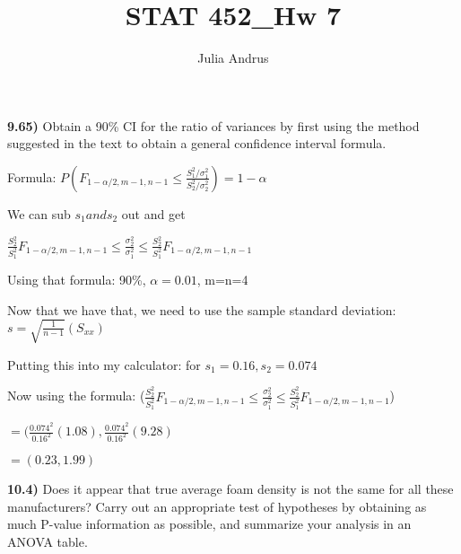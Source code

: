 \documentclass{article}
\title{STAT 452\_Hw 7}
\author{Julia Andrus}
\date{}
\begin{document}
\maketitle 


\textbf{9.65)} Obtain a 90\% CI for the ratio of variances by first using the method suggested in the text to obtain a general confidence interval formula.

\vspace{2mm}

Formula: $P(F_{1-\alpha/2, m-1, n-1} \le \frac{S^{2}_{1}/\sigma^{2}_{1}}{S^{2}_{2}/\sigma^{2}_{2}})=1-\alpha$

\vspace{2mm}

We can sub $s_{1} and s_{2}$ out and get 

\vspace{2mm}

$\frac{S^{2}_{2}}{S^{2}_{1}}F_{1-\alpha/2, m-1, n-1} \le \frac{\sigma^{2}_{2}}{\sigma^{2}_{1}} \le \frac{S^{2}_{2}}{S^{2}_{1}}F_{1-\alpha/2, m-1, n-1}$

\vspace{2mm}

Using that formula: 90\%, $\alpha=0.01$, m=n=4

\vspace{2mm}

Now that we have that, we need to use the sample standard deviation: $s=\sqrt{\frac{1}{n-1}}(S_{xx})$

\vspace{2mm}

Putting this into my calculator: for $s_{1}=0.16, s_{2}=0.074$

\vspace{2mm}

Now using the formula: ($\frac{S^{2}_{2}}{S^{2}_{1}}F_{1-\alpha/2, m-1, n-1} \le \frac{\sigma^{2}_{2}}{\sigma^{2}_{1}} \le \frac{S^{2}_{2}}{S^{2}_{1}}F_{1-\alpha/2, m-1, n-1}$)

\vspace{2mm}

$=(\frac{0.074^{2}}{0.16^{2}}(1.08), \frac{0.074^{2}}{0.16^{2}}(9.28)$

\vspace{2mm}

$=(0.23, 1.99)$


\newpage
\textbf{10.4)} Does it appear that true average foam density is not the same for all these manufacturers? Carry out an appropriate test of hypotheses by obtaining as much P-value information as possible, and summarize your analysis in an ANOVA table.
\end{document}
